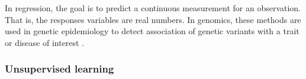 In regression, the goal is to predict a continuous measurement for an observation. That is, the responses variables are real numbers. In genomics, these methods are  used in genetic epidemiology to detect association of genetic variants with a trait or disease of interest \cite{dasgupta2011brief}.




\subsubsection{Unsupervised learning}





